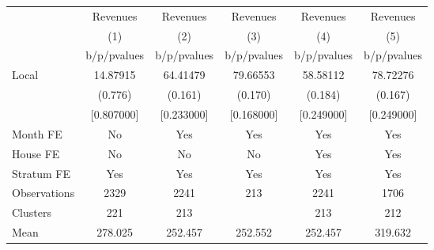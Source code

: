 {
\def\sym#1{\ifmmode^{#1}\else\(^{#1}\)\fi}
\begin{tabular}{l*{5}{c}}
\toprule
                &\multicolumn{1}{c}{Revenues}&\multicolumn{1}{c}{Revenues}&\multicolumn{1}{c}{Revenues}&\multicolumn{1}{c}{Revenues}&\multicolumn{1}{c}{Revenues}\\
                &\multicolumn{1}{c}{(1)}&\multicolumn{1}{c}{(2)}&\multicolumn{1}{c}{(3)}&\multicolumn{1}{c}{(4)}&\multicolumn{1}{c}{(5)}\\
                &b/p/pvalues&b/p/pvalues&b/p/pvalues&b/p/pvalues&b/p/pvalues\\
\midrule
Local           & 14.87915& 64.41479& 79.66553& 58.58112& 78.72276\\
                &  (0.776)&  (0.161)&  (0.170)&  (0.184)&  (0.167)\\
                &[0.807000]&[0.233000]&[0.168000]&[0.249000]&[0.249000]\\
Month FE        &       No&      Yes&      Yes&      Yes&      Yes\\
House FE        &       No&       No&       No&      Yes&      Yes\\
Stratum FE      &      Yes&      Yes&      Yes&      Yes&      Yes\\
\midrule
Observations    &     2329&     2241&      213&     2241&     1706\\
Clusters        &      221&      213&         &      213&      212\\
Mean            &  278.025&  252.457&  252.552&  252.457&  319.632\\
\bottomrule
\end{tabular}
}
